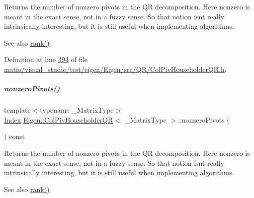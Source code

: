 \begin{DoxyReturn}{Returns}
the number of nonzero pivots in the QR decomposition. Here nonzero is meant in the exact sense, not in a fuzzy sense. So that notion isn\textquotesingle{}t really intrinsically interesting, but it is still useful when implementing algorithms.
\end{DoxyReturn}
\begin{DoxySeeAlso}{See also}
\hyperlink{group___q_r___module_a2a59aaa689613ce5ef0c9130ad33940e}{rank()} 
\end{DoxySeeAlso}


Definition at line \hyperlink{matio_2visual__studio_2test_2eigen_2_eigen_2src_2_q_r_2_col_piv_householder_q_r_8h_source_l00394}{394} of file \hyperlink{matio_2visual__studio_2test_2eigen_2_eigen_2src_2_q_r_2_col_piv_householder_q_r_8h_source}{matio/visual\+\_\+studio/test/eigen/\+Eigen/src/\+Q\+R/\+Col\+Piv\+Householder\+Q\+R.\+h}.

\mbox{\label{group___q_r___module_a796610bab81f0527aa1ae440c71f58a4}} 
\subparagraph{\texorpdfstring{nonzero\+Pivots()}{nonzeroPivots()}\hspace{0.1cm}{\footnotesize\ttfamily [2/2]}}
{\footnotesize\ttfamily template$<$typename \+\_\+\+Matrix\+Type$>$ \\
\hyperlink{namespace_eigen_a62e77e0933482dafde8fe197d9a2cfde}{Index} \hyperlink{group___q_r___module_class_eigen_1_1_col_piv_householder_q_r}{Eigen\+::\+Col\+Piv\+Householder\+QR}$<$ \+\_\+\+Matrix\+Type $>$\+::nonzero\+Pivots (\begin{DoxyParamCaption}{ }\end{DoxyParamCaption}) const\hspace{0.3cm}{\ttfamily [inline]}}

\begin{DoxyReturn}{Returns}
the number of nonzero pivots in the QR decomposition. Here nonzero is meant in the exact sense, not in a fuzzy sense. So that notion isn\textquotesingle{}t really intrinsically interesting, but it is still useful when implementing algorithms.
\end{DoxyReturn}
\begin{DoxySeeAlso}{See also}
\hyperlink{group___q_r___module_a2a59aaa689613ce5ef0c9130ad33940e}{rank()} 
\end{DoxySeeAlso}


